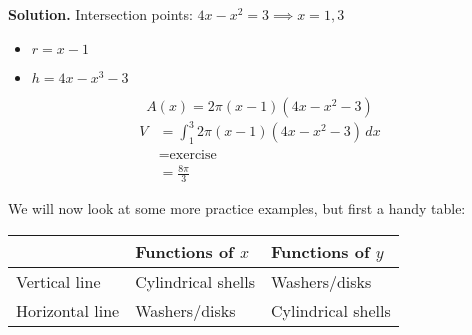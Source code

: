 \begin{Example}{}{}
\begin{enumerate}[label=(\roman*)]
              \textbf{Solution.} Intersection points:
              $ 4x-x^2=3\implies x=1,3 $
              \begin{itemize}
                  \item $ r=x-1 $
                  \item $ h=4x-x^3-3 $
              \end{itemize}
              \[ A(x)=2\pi(x-1)(4x-x^2-3) \]
              \begin{align*}
                  V
                   & =\int_{1}^{3}2\pi(x-1)(4x-x^2-3) \, d{x} \\
                   & =\text{exercise}                         \\
                   & =\frac{8\pi}{3}
              \end{align*}
    \end{enumerate}
\end{Example}

We will now look at some more practice examples, but first a handy table:

\begin{table}[H]
    \centering
    \begin{tabularx}{0.7\linewidth}{@{}YYY@{}}
                        & Functions of $ x $ & Functions of $ y $ \\
        \midrule
        Vertical line   & Cylindrical shells & Washers/disks      \\
        Horizontal line & Washers/disks      & Cylindrical shells
    \end{tabularx}
\end{table}

